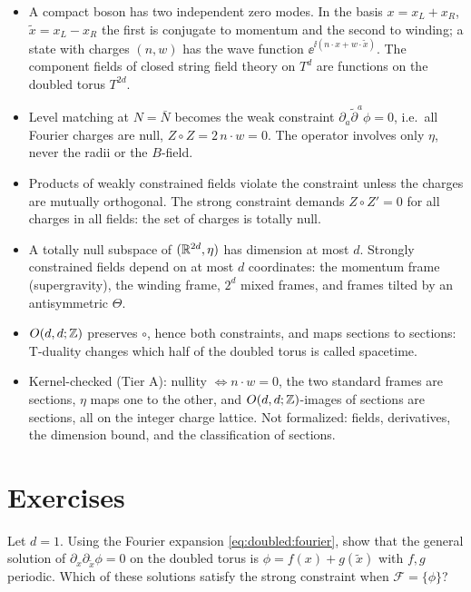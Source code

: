 \begin{summarybox}
\begin{itemize}[leftmargin=*]
\item A compact boson has two independent zero modes. In the basis $x=x_L+x_R$,
 $\tilde x=x_L-x_R$ the first is conjugate to momentum and the second to winding; a state with
 charges $(n,w)$ has the wave function $\ee^{\ii(n\cdot x+w\cdot\tilde x)}$. The component
 fields of closed string field theory on $T^d$ are functions on the doubled torus $T^{2d}$.
\item Level matching at $N=\bar N$ becomes the weak constraint $\partial_a\tilde\partial^a\phi
 =0$, i.e.\ all Fourier charges are null, $Z\circ Z=2\,n\cdot w=0$. The operator involves only
 $\eta$, never the radii or the $B$-field.
\item Products of weakly constrained fields violate the constraint unless the charges are
 mutually orthogonal. The strong constraint demands $Z\circ Z'=0$ for all charges in all
 fields: the set of charges is totally null.
\item A totally null subspace of $(\mathbb{R}^{2d},\eta)$ has dimension at most $d$. Strongly
 constrained fields depend on at most $d$ coordinates: the momentum frame (supergravity), the
 winding frame, $2^d$ mixed frames, and frames tilted by an antisymmetric $\Theta$.
\item $O(d,d;\mathbb{Z})$ preserves $\circ$, hence both constraints, and maps sections to sections:
 T-duality changes which half of the doubled torus is called spacetime.
\item Kernel-checked (Tier A): nullity $\Leftrightarrow n\cdot w=0$, the two standard frames
 are sections, $\eta$ maps one to the other, and $O(d,d;\mathbb{Z})$-images of sections are sections,
 all on the integer charge lattice. Not formalized: fields, derivatives, the dimension bound,
 and the classification of sections.
\end{itemize}
\end{summarybox}

\section*{Exercises}

\begin{exercise}[$\star$]\label{ex:doubled:d1}
Let $d=1$. Using the Fourier expansion \eqref{eq:doubled:fourier}, show that the general
solution of $\partial_x\partial_{\tilde x}\phi=0$ on the doubled torus is
$\phi=f(x)+g(\tilde x)$ with $f,g$ periodic. Which of these solutions satisfy the strong
constraint when $\mathcal F=\{\phi\}$?
\end{exercise}

